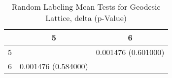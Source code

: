 \begin{table}
\caption{Random Labeling Mean Tests for Geodesic Lattice,  delta (p-Value)}
\label{randomLabelTableGeodesic}
\begin{tabular}{|c||c|c|}
\hline
&5&6\\
\hline
\hline
5& & 0.001476 (0.601000)\\
\hline
6& 0.001476 (0.584000)& \\
\hline
\end{tabular} \end{table}





